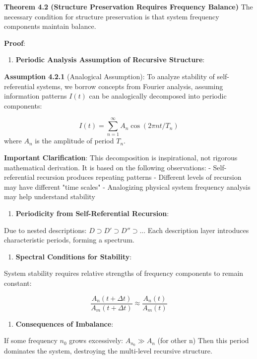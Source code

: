 \textbf{Theorem 4.2 (Structure Preservation Requires Frequency Balance)}
\label{thm:4.2}
The necessary condition for structure preservation is that system frequency components maintain balance.

\textbf{Proof}:

\begin{enumerate}
\item \textbf{Periodic Analysis Assumption of Recursive Structure}:
\end{enumerate}
   
   \textbf{Assumption 4.2.1} (Analogical Assumption): To analyze stability of self-referential systems, we borrow concepts from Fourier analysis, assuming information patterns $I(t)$ can be analogically decomposed into periodic components:
   
\begin{equation}
I(t) = \sum_{n=1}^{\infty} A_n \cos(2\pi nt/T_n)
\end{equation}
   where $A_n$ is the amplitude of period $T_n$.
   
   \textbf{Important Clarification}: This decomposition is inspirational, not rigorous mathematical derivation. It is based on the following observations:
   - Self-referential recursion produces repeating patterns
   - Different levels of recursion may have different "time scales"
   - Analogizing physical system frequency analysis may help understand stability
   
\begin{enumerate}
\item \textbf{Periodicity from Self-Referential Recursion}:
\end{enumerate}
   Due to nested descriptions: $D \supset D' \supset D'' \supset ...$
   Each description layer introduces characteristic periods, forming a spectrum.
   
\begin{enumerate}
\item \textbf{Spectral Conditions for Stability}:
\end{enumerate}
   System stability requires relative strengths of frequency components to remain constant:
   
\begin{equation}
\frac{A_n(t+\Delta t)}{A_m(t+\Delta t)} \approx \frac{A_n(t)}{A_m(t)}
\end{equation}

\begin{enumerate}
\item \textbf{Consequences of Imbalance}:
\end{enumerate}
   If some frequency $n_0$ grows excessively: $A_{n_0} \gg A_n$ (for other n)
   Then this period dominates the system, destroying the multi-level recursive structure.

